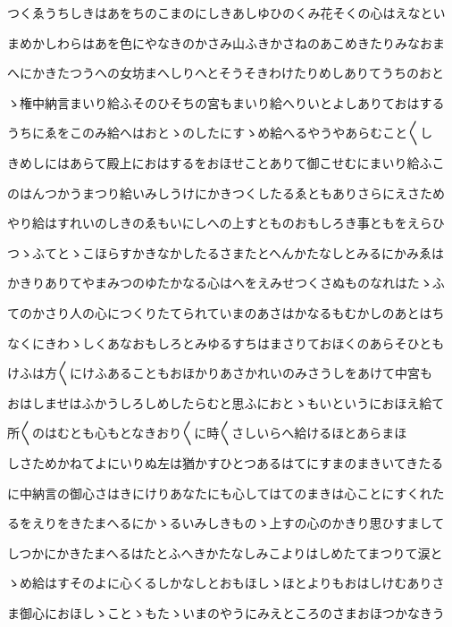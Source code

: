 \documentclass[a4paper,11pt,landscape]{ltjtarticle}
\begin{document}
\par\medskip
つくゑうちしきはあをちのこまのにしきあしゆひのくみ花そくの心はえなとい
\par\medskip
まめかしわらはあを色にやなきのかさみ山ふきかさねのあこめきたりみなおま
\par\medskip
へにかきたつうへの女坊まへしりへとそうそきわけたりめしありてうちのおと
\par\medskip
ゝ権中納言まいり給ふそのひそちの宮もまいり給へりいとよしありておはする
\par\medskip
うちにゑをこのみ給へはおとゝのしたにすゝめ給へるやうやあらむこと〱し
\par\medskip
きめしにはあらて殿上におはするをおほせことありて御こせむにまいり給ふこ
\par\medskip
のはんつかうまつり給いみしうけにかきつくしたるゑともありさらにえさため
\par\medskip
やり給はすれいのしきのゑもいにしへの上すとものおもしろき事ともをえらひ
\par\medskip
つゝふてとゝこほらすかきなかしたるさまたとへんかたなしとみるにかみゑは
\par\medskip
かきりありてやまみつのゆたかなる心はへをえみせつくさぬものなれはたゝふ
\par\medskip
てのかさり人の心につくりたてられていまのあさはかなるもむかしのあとはち
\par\medskip
なくにきわゝしくあなおもしろとみゆるすちはまさりておほくのあらそひとも
\par\medskip
けふは方〱にけふあることもおほかりあさかれいのみさうしをあけて中宮も
\par\medskip
おはしませはふかうしろしめしたらむと思ふにおとゝもいというにおほえ給て
\par\medskip
所〱のはむとも心もとなきおり〱に時〱さしいらへ給けるほとあらまほ
\par\medskip
しさためかねてよにいりぬ左は猶かすひとつあるはてにすまのまきいてきたる
\par\medskip
に中納言の御心さはきにけりあなたにも心してはてのまきは心ことにすくれた
\par\medskip
るをえりをきたまへるにかゝるいみしきものゝ上すの心のかきり思ひすまして
\par\medskip
しつかにかきたまへるはたとふへきかたなしみこよりはしめたてまつりて涙と
\par\medskip
ゝめ給はすそのよに心くるしかなしとおもほしゝほとよりもおはしけむありさ
\par\medskip
ま御心におほしゝことゝもたゝいまのやうにみえところのさまおほつかなきう
\par\medskip
\end{document}
